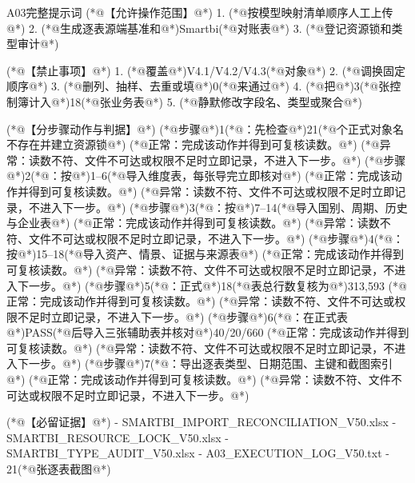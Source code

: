 \documentclass[UTF8,openany,zihao=-4]{ctexbook}
\renewcommand{\_}{\textunderscore\allowbreak}
\begin{document}
\begin{PromptBox}{A03完整提示词}
(*@{\promptcjk 【允许操作范围】}@*)
1. (*@{\promptcjk 按模型映射清单顺序人工上传}@*)
2. (*@{\promptcjk 生成逐表源端基准和}@*)Smartbi(*@{\promptcjk 对账表}@*)
3. (*@{\promptcjk 登记资源锁和类型审计}@*)

(*@{\promptcjk 【禁止事项】}@*)
1. (*@{\promptcjk 覆盖}@*)V4.1/V4.2/V4.3(*@{\promptcjk 对象}@*)
2. (*@{\promptcjk 调换固定顺序}@*)
3. (*@{\promptcjk 删列、抽样、去重或填}@*)0(*@{\promptcjk 来通过}@*)
4. (*@{\promptcjk 把}@*)3(*@{\promptcjk 张控制簿计入}@*)18(*@{\promptcjk 张业务表}@*)
5. (*@{\promptcjk 静默修改字段名、类型或聚合}@*)

(*@{\promptcjk 【分步骤动作与判据】}@*)
(*@{\promptcjk 步骤}@*)1(*@{\promptcjk ：先检查}@*)21(*@{\promptcjk 个正式对象名不存在并建立资源锁}@*)
  (*@{\promptcjk 正常：完成该动作并得到可复核读数。}@*)
  (*@{\promptcjk 异常：读数不符、文件不可达或权限不足时立即记录，不进入下一步。}@*)
(*@{\promptcjk 步骤}@*)2(*@{\promptcjk ：按}@*)1--6(*@{\promptcjk 导入维度表，每张导完立即核对}@*)
  (*@{\promptcjk 正常：完成该动作并得到可复核读数。}@*)
  (*@{\promptcjk 异常：读数不符、文件不可达或权限不足时立即记录，不进入下一步。}@*)
(*@{\promptcjk 步骤}@*)3(*@{\promptcjk ：按}@*)7--14(*@{\promptcjk 导入国别、周期、历史与企业表}@*)
  (*@{\promptcjk 正常：完成该动作并得到可复核读数。}@*)
  (*@{\promptcjk 异常：读数不符、文件不可达或权限不足时立即记录，不进入下一步。}@*)
(*@{\promptcjk 步骤}@*)4(*@{\promptcjk ：按}@*)15--18(*@{\promptcjk 导入资产、情景、证据与来源表}@*)
  (*@{\promptcjk 正常：完成该动作并得到可复核读数。}@*)
  (*@{\promptcjk 异常：读数不符、文件不可达或权限不足时立即记录，不进入下一步。}@*)
(*@{\promptcjk 步骤}@*)5(*@{\promptcjk ：正式}@*)18(*@{\promptcjk 表总行数复核为}@*)313,593
  (*@{\promptcjk 正常：完成该动作并得到可复核读数。}@*)
  (*@{\promptcjk 异常：读数不符、文件不可达或权限不足时立即记录，不进入下一步。}@*)
(*@{\promptcjk 步骤}@*)6(*@{\promptcjk ：在正式表}@*)PASS(*@{\promptcjk 后导入三张辅助表并核对}@*)40/20/660
  (*@{\promptcjk 正常：完成该动作并得到可复核读数。}@*)
  (*@{\promptcjk 异常：读数不符、文件不可达或权限不足时立即记录，不进入下一步。}@*)
(*@{\promptcjk 步骤}@*)7(*@{\promptcjk ：导出逐表类型、日期范围、主键和截图索引}@*)
  (*@{\promptcjk 正常：完成该动作并得到可复核读数。}@*)
  (*@{\promptcjk 异常：读数不符、文件不可达或权限不足时立即记录，不进入下一步。}@*)

(*@{\promptcjk 【必留证据】}@*)
- SMARTBI_IMPORT_RECONCILIATION_V50.xlsx
- SMARTBI_RESOURCE_LOCK_V50.xlsx
- SMARTBI_TYPE_AUDIT_V50.xlsx
- A03_EXECUTION_LOG_V50.txt
- 21(*@{\promptcjk 张逐表截图}@*)


\end{PromptBox}
\end{document}
